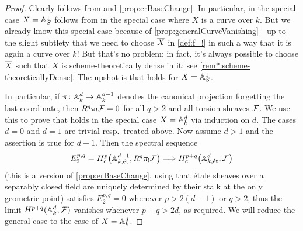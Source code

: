 \documentclass[a4paper, 10pt, oneside, DIV=9, chapterprefix=true, numbers=enddot, bibliography=totoc]{scrbook}
\begin{document}
\begin{proof}
	Clearly  follows from  and \cref{prop:erBaseChange}. In particular,  in the special case $X=\mathbb{A}_S^1$ follows from  in the special case where $X$ is a curve over $k$. But we already know this special case because of \cref{prop:generalCurveVanishing}---up to the slight subtlety that we need to choose $\ov{X}$ in \cref{def:f_!} in such a way that it is again a curve over $k$! But that's no problem: in fact, it's always possible to choose $\ov{X}$ such that $X$ is scheme-theoretically dense in it; see \cref{rem*:scheme-theoreticallyDense}. The upshot is that  holds for $X=\mathbb{A}_S^1$.
	
	In particular, if $\pi\colon \IA^d_k\morphism \IA_k^{d-1}$ denotes the canonical projection forgetting the last coordinate, then $R^q\pi_!\mathcal{F}=0$ for all $q>2$ and all torsion sheaves $\mathcal{F}$. We use this to prove that  holds in the special case $X=\mathbb{A}_k^d$ via induction on $d$. The cases $d=0$ and $d=1$ are trivial resp.\ treated above. Now assume $d>1$ and the assertion is true for $d-1$. Then the spectral sequence
	\begin{equation*}
		E_2^{p,q}=H_c^p\big(\IA_{k,\et}^{d-1},R^q\pi_!\Ff\big)\converge H_c^{p+q}\big(\IA_{k,\et}^d,\Ff\big)
	\end{equation*}
	(this is a version of \cref{prop:erBaseChange}, using that étale sheaves over a separably closed field are uniquely determined by their stalk at the only geometric point) satisfies $E_2^{p,q}=0$ whenever $p>2(d-1)$ or $q>2$, thus the limit $H^{p+q}(\mathbb{A}_k^d,\mathcal{F})$ vanishes whenever $p+q>2d$, as required. We will reduce the general case to the case of $X=\mathbb{A}_k^d$.
	

\end{proof}
\end{document}
